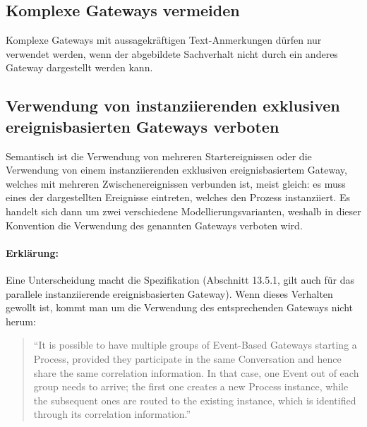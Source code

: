 \documentclass[12pt,report]{snetTeaching}
\begin{document}
\subsection{Komplexe Gateways vermeiden}

Komplexe Gateways mit aussagekräftigen Text-Anmerkungen dürfen nur verwendet werden, wenn der abgebildete Sachverhalt nicht durch ein anderes Gateway dargestellt werden kann.

\begin{Rahmen}
	\hfill
\end{Rahmen}


\clearpage
\subsection{Verwendung von instanziierenden exklusiven ereignisbasierten Gateways verboten}

Semantisch ist die Verwendung von mehreren Startereignissen oder die Verwendung von einem instanziierenden exklusiven ereignisbasiertem Gateway, welches mit mehreren Zwischenereignissen verbunden ist, meist gleich: es muss eines der dargestellten Ereignisse eintreten, welches den Prozess instanziiert. Es handelt sich dann um zwei verschiedene Modellierungsvarianten, weshalb in dieser Konvention die Verwendung des genannten Gateways verboten wird.

\begin{Rahmen}
	\hfill
\end{Rahmen}


\paragraph{Erklärung:} Eine Unterscheidung macht die Spezifikation (Abschnitt 13.5.1, gilt auch für das parallele instanziierende ereignisbasierten Gateway). Wenn dieses Verhalten gewollt ist, kommt man um die Verwendung des entsprechenden Gateways nicht herum:
\begin{quote}
“It is possible to have multiple groups of Event-Based Gateways starting a Process, provided they participate in the same Conversation and hence share the same correlation information. In that case, one Event out of each group needs to arrive; the first one creates a new Process instance, while the subsequent ones are routed to the existing instance, which is identified through its correlation information.” 
\end{quote}
\end{document}
